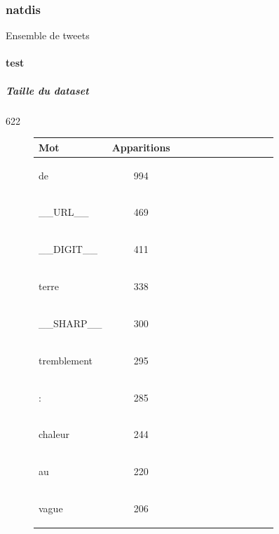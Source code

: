 \subsubsection{natdis} 
 Ensemble de tweets\paragraph{test}
\subparagraph{Taille du dataset}622
\begin{figure}[H] \begin{minipage}{0.48\textwidth} \centering \begin{tabular}{|l || *{11 }{|c} |} \hline
Mot & Apparitions  \\ \hline
\begin{verb} de \end{verb} &994\\ \hline
\begin{verb} __URL__ \end{verb} &469\\ \hline
\begin{verb} __DIGIT__ \end{verb} &411\\ \hline
\begin{verb} terre \end{verb} &338\\ \hline
\begin{verb} __SHARP__ \end{verb} &300\\ \hline
\begin{verb} tremblement \end{verb} &295\\ \hline
\begin{verb} : \end{verb} &285\\ \hline
\begin{verb} chaleur \end{verb} &244\\ \hline
\begin{verb} au \end{verb} &220\\ \hline
\begin{verb} vague \end{verb} &206\\ \hline


\end{tabular}
\end{minipage}
\end{figure}
